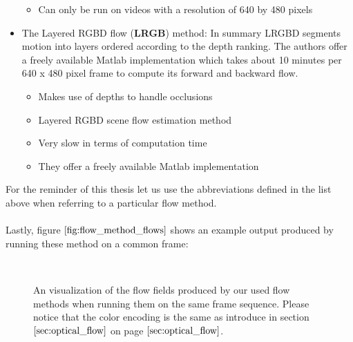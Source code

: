 \begin{itemize}
\begin{itemize}
	\item Can only be run on videos with a resolution of 640 by 480 pixels
	\end{itemize}
\item The Layered RGBD flow (\textbf{LRGB}) method: In summary LRGBD segments motion into layers ordered according to the depth ranking. The authors offer a freely available Matlab implementation which takes about 10 minutes per 640 x 480 pixel frame to compute its forward and backward flow.
	\begin{itemize}
	\item Makes use of depths to handle occlusions
	\item Layered RGBD scene flow estimation method
	\item Very slow in terms of computation time
	\item They offer a freely available Matlab implementation
	\end{itemize}
\end{itemize}
For the reminder of this thesis let us use the abbreviations defined in the list above when referring to a particular flow method. \\ \\
Lastly, figure $\ref{fig:flow_method_flows}$ shows an example output produced by running these method on a common frame:
\begin{figure}[H]
\begin{center}
~
\end{center}
\caption[Flow Method Flows]{An visualization of the flow fields produced by our used flow methods when running them on the same frame sequence. Please notice that the color encoding is the same as introduce in section $\ref{sec:optical_flow}$ on page $\pageref{sec:optical_flow}$.}
\label{fig:flow_method_flows}
\end{figure}

